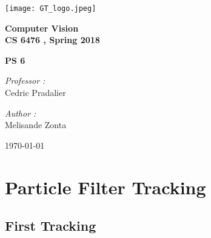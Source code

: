 \documentclass[a4paper,11pt]{article}
\begin{document}

\begin{titlepage}

\begin{center}
\texttt{[image: GT\_logo.jpeg]}
\end{center}
\hrulefill
\begin{center}\bfseries\huge
   Computer Vision \\
   CS 6476 , Spring 2018\\
   \end{center}
  \begin{center}\bfseries\large
     PS 6\\
    \hrulefill
\end{center}
\vspace*{1cm}
\begin{minipage}[t]{0.6\textwidth}
  \begin{flushleft} \large
    \emph{Professor : }\\
    Cedric Pradalier \\
  \end{flushleft}
\end{minipage}
\begin{minipage}[t]{0.3\textwidth}
  \begin{flushright} \large
    \emph{Author :} \\
    Melisande Zonta \\
  \end{flushright}
\end{minipage}
\begin{flushright}
       \today 
\end{flushright} 
\end{titlepage}

\tableofcontents
\clearpage

\section{Particle Filter Tracking}

\subsection{First Tracking}
\end{document}
